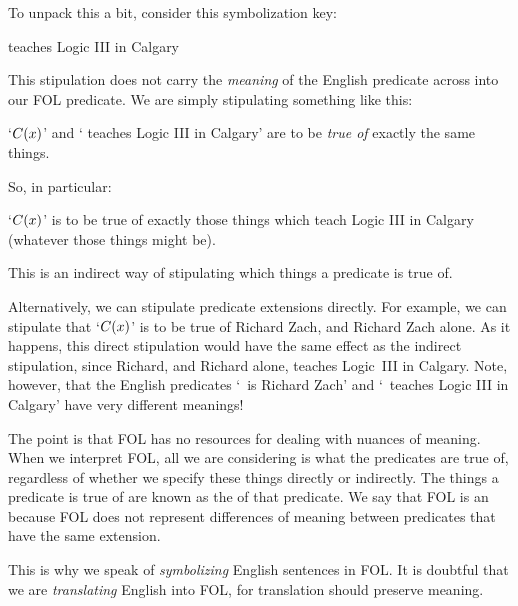 To unpack this a bit, consider this symbolization key: 
	\begin{ekey}
		\item[\atom{C}{x}]  teaches Logic III in Calgary
	\end{ekey} 
This stipulation does not carry the \emph{meaning} of the English predicate across into our FOL predicate. We are simply stipulating something like this:
	\begin{ebullet}
		\item `$\mathord{C}(x)$' and ` teaches Logic III in Calgary' are to be \emph{true of} exactly the same things. 
	\end{ebullet}
So, in particular:
	\begin{ebullet}
		\item `$\mathord{C}(x)$' is to be true of exactly those things which teach Logic III in Calgary (whatever those things might be).
	\end{ebullet}
This is an indirect way of stipulating which things a predicate is true of.

Alternatively, we can stipulate predicate extensions directly. For example, we can stipulate that `$\mathord{C}(x)$' is to be true of Richard Zach, and Richard Zach alone. As it happens, this direct stipulation would have the same effect as the indirect stipulation, since Richard, and Richard alone, teaches Logic~III in Calgary. Note, however, that the English predicates `\blank\ is Richard Zach' and `\blank\ teaches Logic III in Calgary' have very different meanings!

The point is that FOL has no resources for dealing with nuances of meaning. When we interpret FOL, all we are considering is what the predicates are true of, regardless of whether we specify these things directly or indirectly. The things a predicate is true of are known as the  of that predicate. We say that FOL is an  because FOL does not represent differences of meaning between predicates that have the same extension.    

This is why we speak of \emph{symbolizing} English sentences in FOL. It is doubtful that we are \emph{translating} English into FOL, for translation should preserve meaning. 

